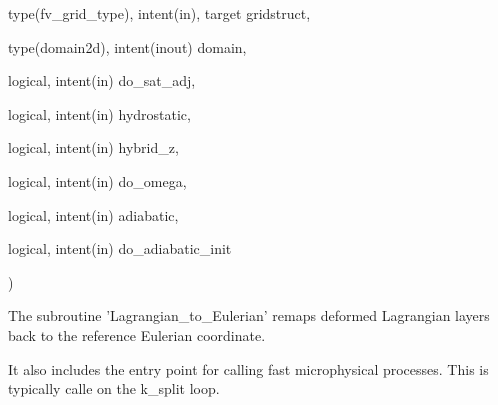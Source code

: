 {\begin{DoxyParamCaption}
\item[{type(fv\-\_\-grid\-\_\-type), intent(in), target}]{gridstruct, }
\item[{type(domain2d), intent(inout)}]{domain, }
\item[{logical, intent(in)}]{do\-\_\-sat\-\_\-adj, }
\item[{logical, intent(in)}]{hydrostatic, }
\item[{logical, intent(in)}]{hybrid\-\_\-z, }
\item[{logical, intent(in)}]{do\-\_\-omega, }
\item[{logical, intent(in)}]{adiabatic, }
\item[{logical, intent(in)}]{do\-\_\-adiabatic\-\_\-init}
\end{DoxyParamCaption}
)}\label{classfv__mapz__mod_a0c56cad3566b5d03032b2c251925ad86}


The subroutine 'Lagrangian\-\_\-to\-\_\-\-Eulerian' remaps deformed Lagrangian layers back to the reference Eulerian coordinate. 

It also includes the entry point for calling fast microphysical processes. This is typically calle on the k\-\_\-split loop.


